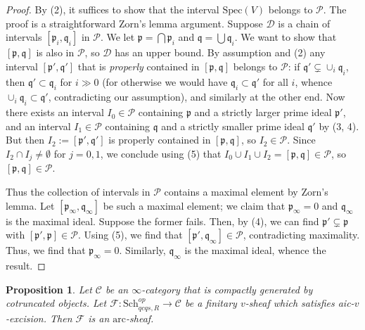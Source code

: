 \documentclass[reqno]{amsart}
\newcommand{\sF}{\mathcal{F}}
\newcommand{\spec}{\mathrm{Spec}}
\newcommand{\arc}{\mathrm{arc}}
\newtheorem{proposition}[theorem]{Proposition}
\theoremstyle{definition}
\begin{document}
\begin{proof} 
By (2), it suffices to show that the interval $\spec(V)$ belongs to $\mathcal{P}$. 
The proof is a straightforward Zorn's lemma argument. 
Suppose $\mathcal{D}$ is a chain of intervals $[\mathfrak{p}_i,
\mathfrak{q}_i]$ in $\mathcal{P}$. 
We let $\mathfrak{p} = \bigcap \mathfrak{p}_i$ and $\mathfrak{q} = \bigcup
\mathfrak{q}_i$. We want to show that $[\mathfrak{p}, \mathfrak{q}]$ is also
in $\mathcal{P}$, so $\mathcal{D}$ has an upper bound. 
By assumption and (2) any interval $[\mathfrak{p}',\mathfrak{q}']$ that is \emph{properly} contained in $[\mathfrak{p},
\mathfrak{q}]$ belongs to $\mathcal{P}$: if $\mathfrak{q}' \subsetneq \cup_i \mathfrak{q}_i$, then $\mathfrak{q}' \subset \mathfrak{q}_i$ for $i \gg 0$ (for otherwise we would have $\mathfrak{q}_i \subset \mathfrak{q}'$ for all $i$, whence $\cup_i \mathfrak{q}_i \subset \mathfrak{q}'$, contradicting our assumption), and similarly at the other end.  Now  there exists an interval $I_0 \in \mathcal{P}$ containing $\mathfrak{p}$ and
a strictly larger prime ideal $\mathfrak{p}'$, and an interval $I_1 \in \mathcal{P}$ containing $\mathfrak{q}$
and a strictly smaller prime ideal $\mathfrak{q}'$ by (3, 4). 
But then $I_2 := [\mathfrak{p}',\mathfrak{q}']$ is properly contained in $[\mathfrak{p},\mathfrak{q}]$, so $I_2 \in \mathcal{P}$. Since $I_2 \cap I_j \neq \emptyset$ for $j={0,1}$, we conclude using (5) that $I_0 \cup I_1 \cup I_2 = [\mathfrak{p}, \mathfrak{q}] \in \mathcal{P}$, so $[\mathfrak{p}, \mathfrak{q}] \in
\mathcal{P}$. 

Thus the collection of intervals in $\mathcal{P}$ contains a maximal element by Zorn's
lemma. 
Let $[\mathfrak{p}_\infty, \mathfrak{q}_\infty]$ be such a maximal element; we
claim that $\mathfrak{p}_\infty = 0$ and $\mathfrak{q}_\infty $ is the maximal
ideal. 
Suppose the former fails. 
Then, by (4), we can find $\mathfrak{p}' \subsetneq \mathfrak{p}$ with 
$[\mathfrak{p}' , \mathfrak{p}] \in \mathcal{P}$. 
Using (5), we find that $[\mathfrak{p}', \mathfrak{q}_\infty] \in \mathcal{P}$,
contradicting maximality. 
Thus, we find that $\mathfrak{p}_\infty = 0$. Similarly, $ \mathfrak{q}_\infty 
$ is the maximal ideal, whence the result. 
\end{proof} 

\begin{proposition} 
\label{aicvexcimpliesarc}
Let $\mathcal{C}$ be an $\infty$-category that is compactly generated by cotruncated objects.
Let $\mathcal{F}\colon  \mathrm{Sch}_{qcqs,R}^{op}\to \mathcal{C}$ be a finitary
$v$-sheaf which satisfies aic-$v$-excision. 
Then $\sF$ is an $\arc$-sheaf. 
\end{proposition} 
\end{document}
